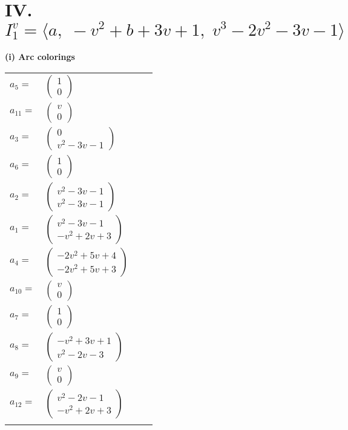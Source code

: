 \documentclass[1p]{elsarticle_modified}
\theoremstyle{definition}
\begin{document}
\centering \section*{IV. $I^v_{1}= \langle a,\;- v^2+b+3 v+1,\;v^3-2 v^2-3 v-1 \rangle$}
\flushleft \textbf{(i) Arc colorings}\\
\begin{tabular}{m{7pt} m{180pt} m{7pt} m{180pt} }
\flushright $a_{5}=$&$\begin{pmatrix}1\\0\end{pmatrix}$ \\
\flushright $a_{11}=$&$\begin{pmatrix}v\\0\end{pmatrix}$ \\
\flushright $a_{3}=$&$\begin{pmatrix}0\\v^2-3 v-1\end{pmatrix}$ \\
\flushright $a_{6}=$&$\begin{pmatrix}1\\0\end{pmatrix}$ \\
\flushright $a_{2}=$&$\begin{pmatrix}v^2-3 v-1\\v^2-3 v-1\end{pmatrix}$ \\
\flushright $a_{1}=$&$\begin{pmatrix}v^2-3 v-1\\- v^2+2 v+3\end{pmatrix}$ \\
\flushright $a_{4}=$&$\begin{pmatrix}-2 v^2+5 v+4\\-2 v^2+5 v+3\end{pmatrix}$ \\
\flushright $a_{10}=$&$\begin{pmatrix}v\\0\end{pmatrix}$ \\
\flushright $a_{7}=$&$\begin{pmatrix}1\\0\end{pmatrix}$ \\
\flushright $a_{8}=$&$\begin{pmatrix}- v^2+3 v+1\\v^2-2 v-3\end{pmatrix}$ \\
\flushright $a_{9}=$&$\begin{pmatrix}v\\0\end{pmatrix}$ \\
\flushright $a_{12}=$&$\begin{pmatrix}v^2-2 v-1\\- v^2+2 v+3\end{pmatrix}$\\&\end{tabular}
\end{document}
